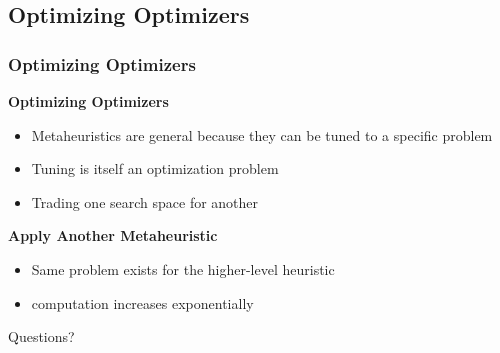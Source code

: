 \documentclass{beamer}
\begin{document}
\subsection{Optimizing Optimizers}
\begin{frame}
\frametitle{Optimizing Optimizers}

\textbf{Optimizing Optimizers}
\begin{itemize}
\item Metaheuristics are general because they can be tuned to a specific problem
\item Tuning is itself an optimization problem
\item Trading one search space for another
\end{itemize}

\textbf{Apply Another Metaheuristic}
\begin{itemize}
\item Same problem exists for the higher-level heuristic
\item computation increases exponentially

\end{itemize}

\end{frame}



\begin{frame}
\Huge{\centerline{Questions?}}
\end{frame}

\end{document}
